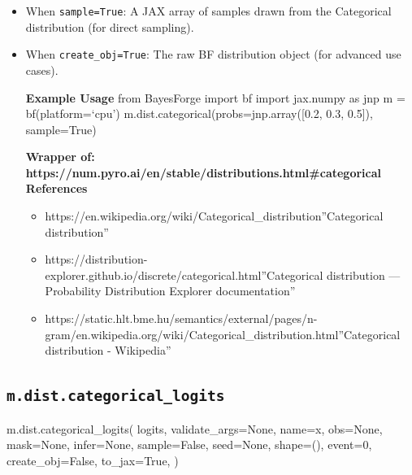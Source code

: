 \documentclass[
  letterpaper,
  DIV=11,
  numbers=noendperiod]{scrartcl}
\newenvironment{Shaded}{\begin{snugshade}}{\end{snugshade}}
\newcommand{\DecValTok}[1]{\textcolor[rgb]{0.68,0.00,0.00}{#1}}
\newcommand{\NormalTok}[1]{\textcolor[rgb]{0.00,0.23,0.31}{#1}}
\newcommand{\OperatorTok}[1]{\textcolor[rgb]{0.37,0.37,0.37}{#1}}
\newcommand{\StringTok}[1]{\textcolor[rgb]{0.13,0.47,0.30}{#1}}
\newcommand{\VariableTok}[1]{\textcolor[rgb]{0.07,0.07,0.07}{#1}}
\providecommand{\tightlist}{%
  \setlength{\itemsep}{0pt}\setlength{\parskip}{0pt}}\usepackage{longtable,booktabs,array}
\begin{document}
\begin{itemize}
\item
  When \texttt{sample=True}: A JAX array of samples drawn from the
  Categorical distribution (for direct sampling).
\item
  When \texttt{create\_obj=True}: The raw BF distribution object (for
  advanced use cases).

  \textbf{Example Usage} from BayesForge import bf import jax.numpy as
  jnp m = bf(platform=`cpu') m.dist.categorical(probs=jnp.array({[}0.2,
  0.3, 0.5{]}), sample=True)

  \textbf{Wrapper of:
  https://num.pyro.ai/en/stable/distributions.html\#categorical}
  \textbf{References}

  \begin{itemize}
  \tightlist
  \item
    https://en.wikipedia.org/wiki/Categorical\_distribution''Categorical
    distribution''
  \item
    https://distribution-explorer.github.io/discrete/categorical.html''Categorical
    distribution --- Probability Distribution Explorer documentation''
  \item
    https://static.hlt.bme.hu/semantics/external/pages/n-gram/en.wikipedia.org/wiki/Categorical\_distribution.html''Categorical
    distribution - Wikipedia''
  \end{itemize}
\end{itemize}

\subsection{\texorpdfstring{\texttt{m.dist.categorical\_logits}}{m.dist.categorical\_logits}}\label{categorical_logits}

\begin{Shaded}
\begin{Highlighting}[]
\NormalTok{m.dist.categorical\_logits(}
\NormalTok{    logits,}
\NormalTok{    validate\_args}\OperatorTok{=}\VariableTok{None}\NormalTok{,}
\NormalTok{    name}\OperatorTok{=}\StringTok{\textquotesingle{}x\textquotesingle{}}\NormalTok{,}
\NormalTok{    obs}\OperatorTok{=}\VariableTok{None}\NormalTok{,}
\NormalTok{    mask}\OperatorTok{=}\VariableTok{None}\NormalTok{,}
\NormalTok{    infer}\OperatorTok{=}\VariableTok{None}\NormalTok{,}
\NormalTok{    sample}\OperatorTok{=}\VariableTok{False}\NormalTok{,}
\NormalTok{    seed}\OperatorTok{=}\VariableTok{None}\NormalTok{,}
\NormalTok{    shape}\OperatorTok{=}\NormalTok{(),}
\NormalTok{    event}\OperatorTok{=}\DecValTok{0}\NormalTok{,}
\NormalTok{    create\_obj}\OperatorTok{=}\VariableTok{False}\NormalTok{,}
\NormalTok{    to\_jax}\OperatorTok{=}\VariableTok{True}\NormalTok{,}
\NormalTok{)}
\end{Highlighting}
\end{Shaded}
\end{document}
